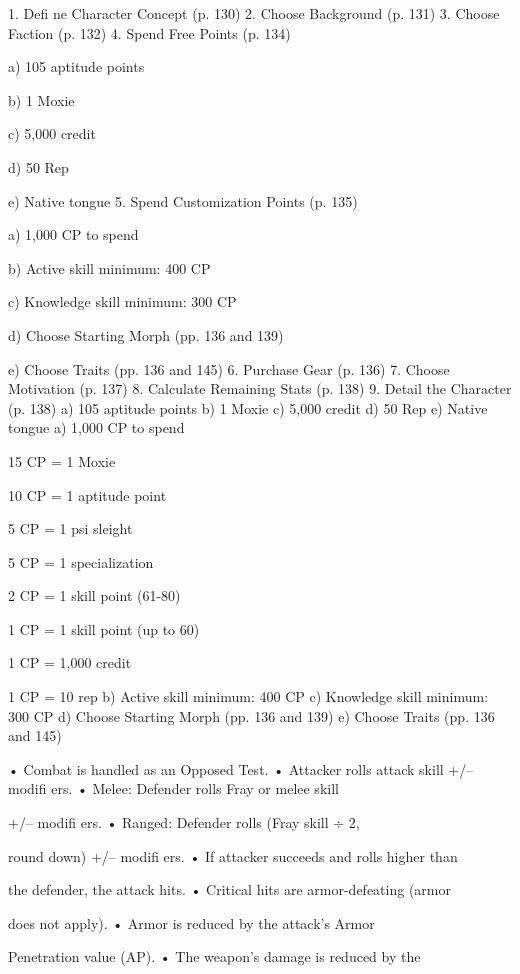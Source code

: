 1. Deﬁ ne Character Concept (p. 130)
2. Choose Background (p. 131)
3. Choose Faction (p. 132)
4. Spend Free Points (p. 134)

a) 105 aptitude points

b) 1 Moxie

c) 5,000 credit

d) 50 Rep

e) Native tongue
5. Spend Customization Points (p. 135)

a) 1,000 CP to spend
 
 
 
 
 
 
 
 

b) Active skill minimum: 400 CP

c) Knowledge skill minimum: 300 CP

d) Choose Starting Morph (pp. 136 and 139)

e) Choose Traits (pp. 136 and 145)
6. Purchase Gear (p. 136)
7. Choose Motivation (p. 137) 
8. Calculate Remaining Stats (p. 138)
9. Detail the Character (p. 138)
a) 105 aptitude points
b) 1 Moxie
c) 5,000 credit
d) 50 Rep
e) Native tongue
a) 1,000 CP to spend

15 CP = 1 Moxie

10 CP = 1 aptitude point

5 CP = 1 psi sleight

5 CP = 1 specialization

2 CP = 1 skill point (61-80)

1 CP = 1 skill point (up to 60)

1 CP = 1,000 credit

1 CP = 10 rep
b) Active skill minimum: 400 CP
c) Knowledge skill minimum: 300 CP
d) Choose Starting Morph (pp. 136 and 139)
e) Choose Traits (pp. 136 and 145)

•  Combat is handled as an Opposed Test.
•  Attacker rolls attack skill +/– modiﬁ ers.
•  Melee: Defender rolls Fray or melee skill 

+/– modiﬁ ers.
•  Ranged: Defender rolls (Fray skill ÷ 2, 

round down) +/– modiﬁ ers.
•  If attacker succeeds and rolls higher than 

the defender, the attack hits.
•  Critical hits are armor-defeating (armor 

does not apply).
•  Armor is reduced by the attack's Armor 

Penetration value (AP).
•  The weapon's damage is reduced by the 

